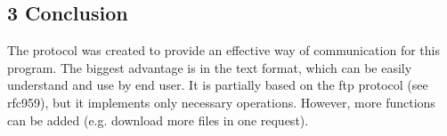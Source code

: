 \documentclass[11pt,a4paper]{article}
\begin{document}
\subsection*{3 Conclusion}

The protocol was created to provide an effective way of communication for this program.
The biggest advantage is in the text format, which can be easily understand and use by end user.
It is partially based on the ftp protocol (see rfc959), but it implements only necessary operations.
However, more functions can be added (e.g. download more files in one request).
\end{document}

